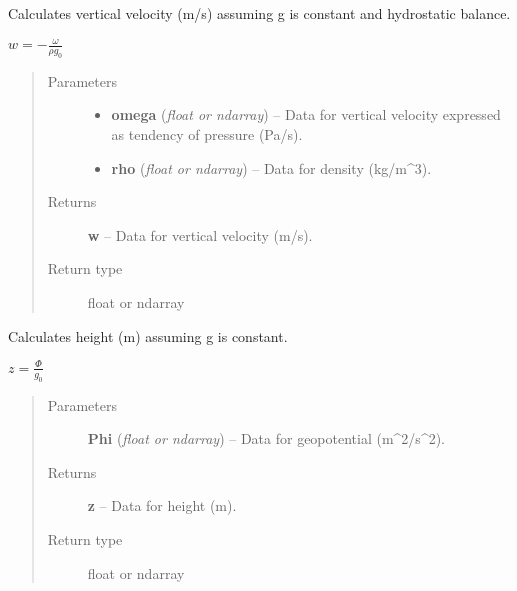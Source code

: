 \documentclass[letterpaper,10pt,english]{sphinxmanual}
\begin{document}

\begin{fulllineitems}
\label{atmos:atmos.equations.w_from_omega_rho_hydrostatic}
Calculates vertical velocity (m/s) assuming g is constant and hydrostatic
balance.

\(w = - \frac{\omega}{\rho g_0}\)
\begin{quote}\begin{description}
\item[{Parameters}] \leavevmode\begin{itemize}
\item {} 
\textbf{omega} (\emph{float or ndarray}) -- Data for vertical velocity expressed as tendency of pressure (Pa/s).

\item {} 
\textbf{rho} (\emph{float or ndarray}) -- Data for density (kg/m\textasciicircum{}3).

\end{itemize}

\item[{Returns}] \leavevmode
\textbf{w} --
Data for vertical velocity (m/s).

\item[{Return type}] \leavevmode
float or ndarray

\end{description}\end{quote}

\end{fulllineitems}


\begin{fulllineitems}
\label{atmos:atmos.equations.z_from_Phi}
Calculates height (m) assuming g is constant.

\(z = \frac{\Phi}{g_0}\)
\begin{quote}\begin{description}
\item[{Parameters}] \leavevmode
\textbf{Phi} (\emph{float or ndarray}) -- Data for geopotential (m\textasciicircum{}2/s\textasciicircum{}2).

\item[{Returns}] \leavevmode
\textbf{z} --
Data for height (m).

\item[{Return type}] \leavevmode
float or ndarray

\end{description}\end{quote}

\end{fulllineitems}
\end{document}
